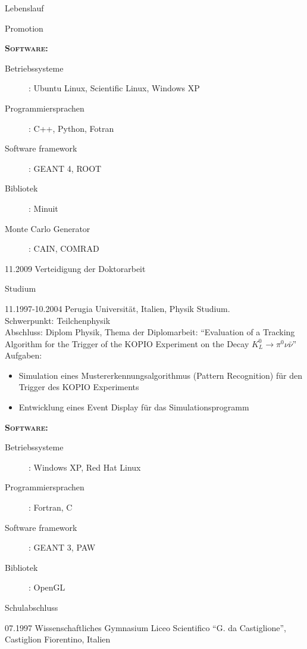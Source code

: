 \documentclass[11pt,a4paper]{scrartcl}
\begin{document}
\begin{cv}{Lebenslauf}
\begin{cvlist}{Promotion}
\begin{itemize}
\end{itemize}

{\scshape {\bfseries Software:}}
\begin{description}
\item[Betriebssysteme] : Ubuntu Linux, Scientific Linux, Windows XP
\item[Programmiersprachen] : C++, Python, Fotran
\item[Software framework] : GEANT 4, ROOT
\item[Bibliotek] : Minuit
\item[Monte Carlo Generator] : CAIN, COMRAD
\end{description}

\item[11.2009] Verteidigung der Doktorarbeit

\end{cvlist}

\begin{cvlist}{Studium}
\item [11.1997-10.2004]Perugia Universit\"at, Italien, Physik
Studium. \\ Schwerpunkt: Teilchenphysik\\ Abschluss: Diplom
Physik, Thema der Diplomarbeit: "`Evaluation of a Tracking
Algorithm for the Trigger of the KOPIO Experiment on the Decay
$K_L^0\rightarrow\pi^0\nu\bar{\nu}$"'\\

Aufgaben:\\

\begin{itemize}
  \item Simulation eines Mustererkennungsalgorithmus (Pattern
  Recognition) f{\"u}r den Trigger des KOPIO Experiments
  \item Entwicklung eines Event Display f{\"u}r das Simulationsprogramm
\end{itemize}

{\scshape {\bfseries Software:}}
\begin{description}
\item[Betriebssysteme] : Windows XP, Red Hat Linux
\item[Programmiersprachen] : Fortran, C
\item[Software framework] : GEANT 3, PAW
\item[Bibliotek] : OpenGL
\end{description}
\end{cvlist}

\begin{cvlist}{Schulabschluss}
\item[07.1997] Wissenschaftliches Gymnasium Liceo Scientifico "`G. da
Castiglione"', Castiglion Fiorentino, Italien
\end{cvlist}


\end{cv}
\end{document}
